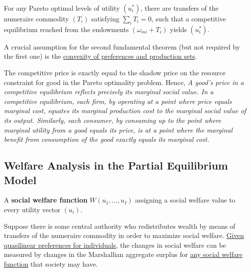 \documentclass{report}
\begin{document}
		\begin{proposition}
			For any Pareto optimal levels of utility $(u^*_i)$, there are transfers of the numeraire commodity $(T_i)$ satisfying $\sum_i T_i = 0$, such that a competitive equilibrium reached from the endowments $(\omega_{mi}+T_i)$ yields $(u_i^*)$.
		\end{proposition}
		
		\begin{remark}
			A crucial assumption for the second fundamental theorem (but not required by the first one) is the \ul{convexity of preferences and production sets}.
		\end{remark}
		
		\begin{remark}
			The competitive price is exactly equal to the shadow price on the resource constraint for good in the Pareto optimality problem. Hence, \emph{A good's price in a competitive equilibrium reflects precisely its marginal social value. In a competitive equilibrium, each firm, by operating at a point where price equals marginal cost, equates its marginal production cost to the marginal social value of its output. Similarly, each consumer, by consuming up to the point where marginal utility from a good equals its price, is at a point where the marginal benefit from consumption of the good exactly equals its marginal cost.}
		\end{remark}
		
		\subsection{Welfare Analysis in the Partial Equilibrium Model}
		
		\begin{definition}
			A \textbf{social welfare function} $W(u_1, \dots, u_I)$ assigning a social welfare value to every utility vector $(u_i)$.
		\end{definition}
		
		\begin{proposition}
			Suppose there is some central authority who redistributes wealth by means of transfers of the numeraire commodity in order to maximize social welfare. \ul{Given quasilinear preferences for individuals}, the changes in social welfare can be measured by changes in the Marshallian aggregate surplus for \ul{any social welfare function} that society may have.
		\end{proposition}
		
\end{document}
